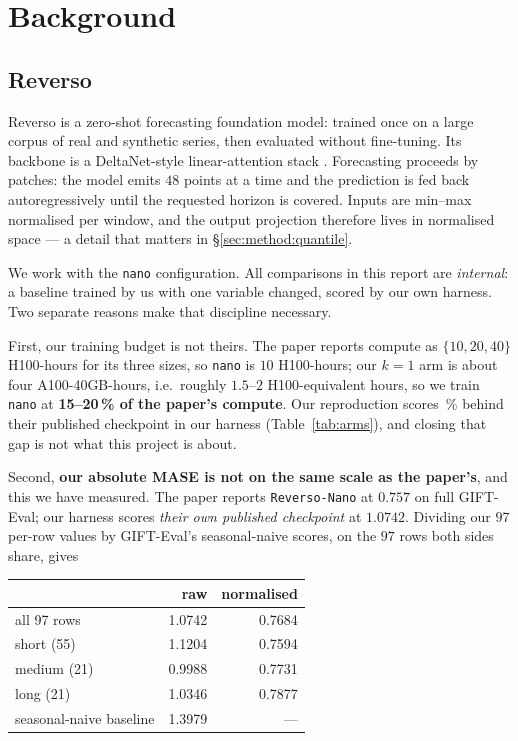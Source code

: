 \section{Background}
\label{sec:background}

\subsection{Reverso}

Reverso is a zero-shot forecasting foundation model: trained once on a large
corpus of real and synthetic series, then evaluated without fine-tuning. Its
backbone is a DeltaNet-style linear-attention stack
\citep{yang2024deltanet, yang2025gateddeltanet}. Forecasting proceeds by
patches: the model emits $48$ points at a time and the prediction is fed back
autoregressively until the requested horizon is covered. Inputs are min--max
normalised per window, and the output projection therefore lives in normalised
space --- a detail that matters in \S\ref{sec:method:quantile}.

We work with the \texttt{nano} configuration. All comparisons in this report are
\emph{internal}: a baseline trained by us with one variable changed, scored by
our own harness. Two separate reasons make that discipline necessary.

First, our training budget is not theirs. The paper reports compute as
$\{10, 20, 40\}$ H100-hours for its three sizes, so \texttt{nano} is
$10$ H100-hours; our $k{=}1$ arm is about four A100-40GB-hours, i.e.\ roughly
$1.5$--$2$ H100-equivalent hours, so we train \texttt{nano} at
\textbf{15--20\,\% of the paper's compute}. Our reproduction scores
\ReproGap\,\% behind their published checkpoint in our harness
(Table~\ref{tab:arms}), and closing that gap is not what this project is about.

Second, \textbf{our absolute MASE is not on the same scale as the paper's},
and this we have measured. The paper reports \texttt{Reverso-Nano} at $0.757$
on full GIFT-Eval; our harness scores \emph{their own published checkpoint} at
$1.0742$. Dividing our $97$ per-row values by GIFT-Eval's seasonal-naive
scores, on the $97$ rows both sides share, gives

\begin{center}\small
\begin{tabular}{lrr}
  \toprule
   & raw & normalised \\
  \midrule
  all 97 rows & 1.0742 & 0.7684 \\
  short (55)  & 1.1204 & 0.7594 \\
  medium (21) & 0.9988 & 0.7731 \\
  long (21)   & 1.0346 & 0.7877 \\
  \midrule
  seasonal-naive baseline & 1.3979 & --- \\
  \bottomrule
\end{tabular}
\end{center}

